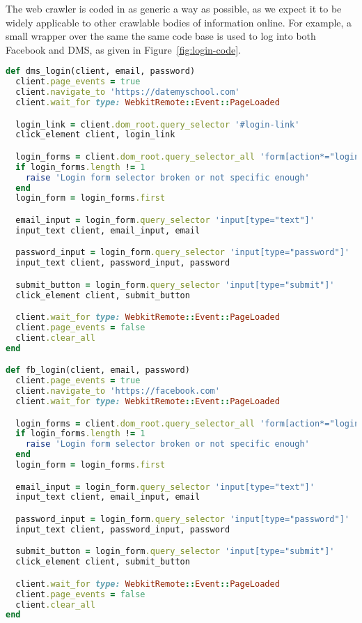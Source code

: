 The web crawler is coded in as generic a way as possible, as we expect it to be widely applicable to other crawlable bodies of information online.
For example, a small wrapper over the same the same code base is used to log into both Facebook and DMS, as given in Figure~\ref{fig:login-code}.

\begin{figure*}
\begin{lstlisting}[language=Ruby]
def dms_login(client, email, password)
  client.page_events = true
  client.navigate_to 'https://datemyschool.com'
  client.wait_for type: WebkitRemote::Event::PageLoaded

  login_link = client.dom_root.query_selector '#login-link'
  click_element client, login_link

  login_forms = client.dom_root.query_selector_all 'form[action*="login"]'
  if login_forms.length != 1
    raise 'Login form selector broken or not specific enough'
  end
  login_form = login_forms.first

  email_input = login_form.query_selector 'input[type="text"]'
  input_text client, email_input, email

  password_input = login_form.query_selector 'input[type="password"]'
  input_text client, password_input, password

  submit_button = login_form.query_selector 'input[type="submit"]'
  click_element client, submit_button

  client.wait_for type: WebkitRemote::Event::PageLoaded
  client.page_events = false
  client.clear_all
end

def fb_login(client, email, password)
  client.page_events = true
  client.navigate_to 'https://facebook.com'
  client.wait_for type: WebkitRemote::Event::PageLoaded

  login_forms = client.dom_root.query_selector_all 'form[action*="login"]'
  if login_forms.length != 1
    raise 'Login form selector broken or not specific enough'
  end
  login_form = login_forms.first

  email_input = login_form.query_selector 'input[type="text"]'
  input_text client, email_input, email

  password_input = login_form.query_selector 'input[type="password"]'
  input_text client, password_input, password

  submit_button = login_form.query_selector 'input[type="submit"]'
  click_element client, submit_button

  client.wait_for type: WebkitRemote::Event::PageLoaded
  client.page_events = false
  client.clear_all
end
\end{lstlisting}
\caption{Crawler login code for DMS and Facebook.}
\label{fig:login-code}
\end{figure*}

